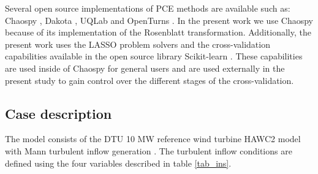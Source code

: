 \documentclass[preprint,12pt]{elsarticle}
\begin{document}
Several open source implementations of PCE methods are available such as: Chaospy \cite{feinberg2015chaospy}, Dakota \cite{eldred2007dakota}, UQLab \cite{marelli2014uqlab} and OpenTurns \cite{andrianov2007open}. In the present work we use Chaospy because of its implementation of the Rosenblatt transformation. Additionally, the present work uses the  LASSO problem solvers \cite{tibshirani1996regression} and the cross-validation capabilities available in the open source library Scikit-learn \cite{pedregosa2011scikit}. These capabilities are used inside of Chaospy for general users and are used externally in the present study to gain control over the different stages of the cross-validation.

\subsection{Case description}

The model consists of the DTU 10 MW reference wind turbine HAWC2 model \cite{larsen20072, bak2012light} with Mann turbulent inflow generation \cite{Mann1998}. The turbulent inflow conditions are defined using the four variables described in table \ref{tab_ins}.

\begin{table}[!h]
\begin{centering}
\caption{Wind turbine model inputs.}
\label{tab_ins}
\end{centering}
\end{table}
\end{document}
